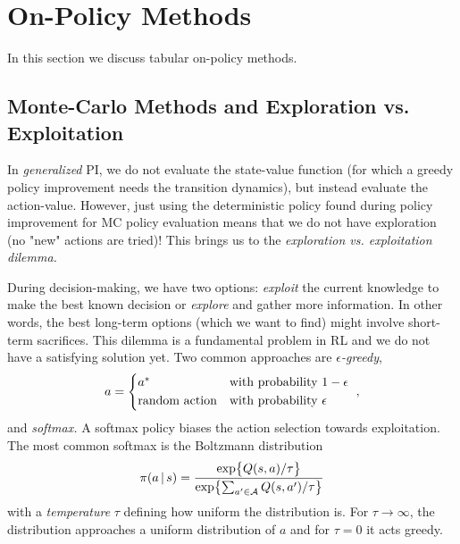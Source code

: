 	\section{On-Policy Methods}
		In this section we discuss tabular on-policy methods.

		\subsection{Monte-Carlo Methods and Exploration vs. Exploitation}
			\label{subsec:mcExploration}

			In \emph{generalized} \ac{PI}, we do not evaluate the state-value function (for which a greedy policy improvement needs the transition dynamics), but instead evaluate the action-value. However, just using the deterministic policy found during policy improvement for \ac{MC} policy evaluation means that we do not have exploration (no "new" actions are tried)! This brings us to the \emph{exploration vs. exploitation dilemma.}

			During decision-making, we have two options: \emph{exploit} the current knowledge to make the best known decision or \emph{explore} and gather more information. In other words, the best long-term options (which we want to find) might involve short-term sacrifices. This dilemma is a fundamental problem in \ac{RL} and we do not have a satisfying solution yet. Two common approaches are \emph{\(\epsilon\)-greedy},
			\begin{align}
				a =
					\begin{cases*}
						a^\ast & with probability \(1 - \epsilon\) \\
						\text{random action} & with probability \(\epsilon\)
					\end{cases*},
			\end{align}
			and \emph{softmax.} A softmax policy biases the action selection towards exploitation. The most common softmax is the Boltzmann distribution
			\begin{equation}
				\pi(a \,\vert\, s) = \frac{\exp\bigl\{ Q(s, a) / \tau \bigr\}}{\exp\bigl\{ \sum_{a' \in \mathcal{A}} Q(s, a') / \tau \bigr\}}
			\end{equation}
			with a \emph{temperature} \(\tau\) defining how uniform the distribution is. For \(\tau \to \infty\), the distribution approaches a uniform distribution of \(a\) and for \(\tau = 0\) it acts greedy.


